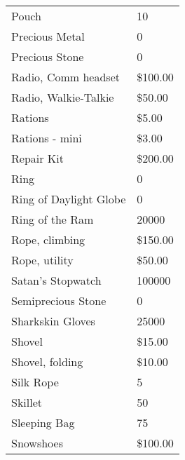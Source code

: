 \documentclass[twoside]{book}
\begin{document}
\begin{longtable}{p{1.25in}l}
  \raggedright
           Pouch 
  &
   10 
  \tabularnewline
      
  \raggedright
           Precious Metal 
  &
   0 
  \tabularnewline
      
  \raggedright
           Precious Stone 
  &
   0 
  \tabularnewline
      
  \raggedright
           Radio, Comm headset 
  &
   \$100.00 
  \tabularnewline
      
  \raggedright
           Radio, Walkie-Talkie 
  &
   \$50.00 
  \tabularnewline
      
  \raggedright
           Rations 
  &
   \$5.00 
  \tabularnewline
      
  \raggedright
           Rations - mini 
  &
   \$3.00 
  \tabularnewline
      
  \raggedright
           Repair Kit 
  &
   \$200.00 
  \tabularnewline
      
  \raggedright
           Ring 
  &
   0 
  \tabularnewline
      
  \raggedright
           Ring of Daylight Globe 
  &
   0 
  \tabularnewline
      
  \raggedright
           Ring of the Ram 
  &
   20000 
  \tabularnewline
      
  \raggedright
           Rope, climbing 
  &
   \$150.00 
  \tabularnewline
      
  \raggedright
           Rope, utility 
  &
   \$50.00 
  \tabularnewline
      
  \raggedright
           Satan's Stopwatch 
  &
   100000 
  \tabularnewline
      
  \raggedright
           Semiprecious Stone 
  &
   0 
  \tabularnewline
      
  \raggedright
           Sharkskin Gloves 
  &
   25000 
  \tabularnewline
      
  \raggedright
           Shovel 
  &
   \$15.00 
  \tabularnewline
      
  \raggedright
           Shovel, folding 
  &
   \$10.00 
  \tabularnewline
      
  \raggedright
           Silk Rope 
  &
   5 
  \tabularnewline
      
  \raggedright
           Skillet 
  &
   50 
  \tabularnewline
      
  \raggedright
           Sleeping Bag 
  &
   75 
  \tabularnewline
      
  \raggedright
           Snowshoes 
  &
   \$100.00 
  \tabularnewline
      

\end{longtable}
\end{document}
